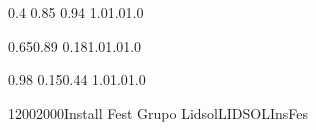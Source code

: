 \documentclass[a4paper,10pt]{report}
\begin{document}
 \thispagestyle{empty}
 \begin{landscape}
 
 \setslotsize{2.8cm}{0.25cm}
 \settextframe{1.0mm}
 
 
 
 

 
      {0.4} {0.85} {0.94} {1.0}{1.0}{1.0}
 
        {0.65}{0.89} {0.18}{1.0}{1.0}{1.0}

 
 
 
   {0.98} {0.15}{0.44} {1.0}{1.0}{1.0}
 
 
 \begin{timetable}
 

 
   
   
   
   
   
    
  
    {1200}{2000}{Install Fest }{Grupo Lidsol}{{\tiny LIDSOL}}{InsFes}
   

\end{timetable}
\end{landscape}
\end{document}
